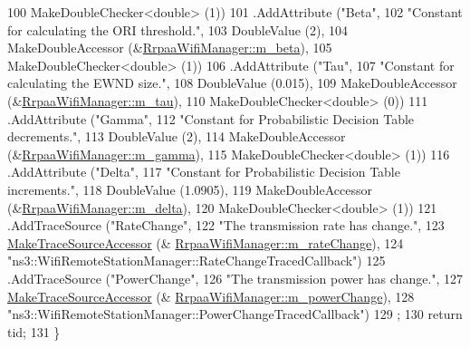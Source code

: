 \begin{DoxyCode}
100                    MakeDoubleChecker<double> (1))
101     .AddAttribute (\textcolor{stringliteral}{"Beta"},
102                    \textcolor{stringliteral}{"Constant for calculating the ORI threshold."},
103                    DoubleValue (2),
104                    MakeDoubleAccessor (&\hyperlink{classns3_1_1RrpaaWifiManager_a0b6ca1511f7b4e0bebea6418b8fbf4eb}{RrpaaWifiManager::m\_beta}),
105                    MakeDoubleChecker<double> (1))
106     .AddAttribute (\textcolor{stringliteral}{"Tau"},
107                    \textcolor{stringliteral}{"Constant for calculating the EWND size."},
108                    DoubleValue (0.015),
109                    MakeDoubleAccessor (&\hyperlink{classns3_1_1RrpaaWifiManager_aa92c842dd6d783f3ebf0c0fbcf6984d3}{RrpaaWifiManager::m\_tau}),
110                    MakeDoubleChecker<double> (0))
111     .AddAttribute (\textcolor{stringliteral}{"Gamma"},
112                    \textcolor{stringliteral}{"Constant for Probabilistic Decision Table decrements."},
113                    DoubleValue (2),
114                    MakeDoubleAccessor (&\hyperlink{classns3_1_1RrpaaWifiManager_ac328ed40e8e145afd21934caf52898b4}{RrpaaWifiManager::m\_gamma}),
115                    MakeDoubleChecker<double> (1))
116     .AddAttribute (\textcolor{stringliteral}{"Delta"},
117                    \textcolor{stringliteral}{"Constant for Probabilistic Decision Table increments."},
118                    DoubleValue (1.0905),
119                    MakeDoubleAccessor (&\hyperlink{classns3_1_1RrpaaWifiManager_aca7d4b5e9e8758b935433bc5c9ad24af}{RrpaaWifiManager::m\_delta}),
120                    MakeDoubleChecker<double> (1))
121     .AddTraceSource (\textcolor{stringliteral}{"RateChange"},
122                      \textcolor{stringliteral}{"The transmission rate has change."},
123                      \hyperlink{group__tracing_gab21a770b9855af4e8f69f7531ea4a6b0}{MakeTraceSourceAccessor} (&
      \hyperlink{classns3_1_1RrpaaWifiManager_a8036ec80b5e8683768e0081ed8f52100}{RrpaaWifiManager::m\_rateChange}),
124                      \textcolor{stringliteral}{"ns3::WifiRemoteStationManager::RateChangeTracedCallback"})
125     .AddTraceSource (\textcolor{stringliteral}{"PowerChange"},
126                      \textcolor{stringliteral}{"The transmission power has change."},
127                      \hyperlink{group__tracing_gab21a770b9855af4e8f69f7531ea4a6b0}{MakeTraceSourceAccessor} (&
      \hyperlink{classns3_1_1RrpaaWifiManager_a4f6bc3b3289bae4f456cff3062a6ebc0}{RrpaaWifiManager::m\_powerChange}),
128                      \textcolor{stringliteral}{"ns3::WifiRemoteStationManager::PowerChangeTracedCallback"})
129   ;
130   \textcolor{keywordflow}{return} tid;
131 \}
\end{DoxyCode}


